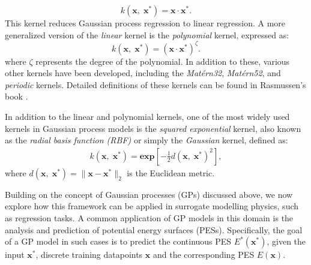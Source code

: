 \begin{equation} \label{equ:2.30}
k(\mathbf{x},\;\mathbf{x}^{\ast}) = \mathbf{x} \cdot \mathbf{x}^{\ast}. 
\end{equation}
This kernel reduces Gaussian process regression to linear regression. A more generalized version of the \textit{linear} kernel is the \textit{polynomial} kernel, expressed as:
\begin{equation} \label{equ:2.31}
    k(\mathbf{x},\;\mathbf{x}^{\ast}) = (\mathbf{x} \cdot \mathbf{x}^{\ast})^{\zeta}.
\end{equation}
where $\zeta$ represents the degree of the polynomial.
In addition to these, various other kernels have been developed, including the \textit{Mat\'{e}rn32}, \textit{Mat\'{e}rn52}, and \textit{periodic} kernels.
Detailed definitions of these kernels can be found in Rasmussen's book \cite{RasmussenW06}.

In addition to the linear and polynomial kernels, one of the most widely used kernels in Gaussian process models is the \textit{squared exponential} kernel, also known as the \textit{radial basis function (RBF)} or simply the \textit{Gaussian} kernel, defined as:
\begin{equation} \label{equ:2.32}
        \begin{split}
            k(\mathbf{x},\;\mathbf{x}^{*})= \mathbf{exp}\left[-\frac{1}{2}d(\mathbf{x},\;\mathbf{x}^{*})^{2}\right],
        \end{split}
\end{equation}
where $d(\mathbf{x},\;\mathbf{x}^{*})=\lVert\mathbf{x}-\mathbf{x}^{*}\rVert_{2}$ is the Euclidean metric.

Building on the concept of Gaussian processes (GPs) discussed above, we now explore how this framework can be applied in surrogate modelling physics, such as regression tasks.
A common application of GP models in this domain is the analysis and prediction of potential energy surfaces (PESs). 
Specifically, the goal of a GP model in such cases is to predict the continuous PES $E^{*}(\mathbf{x}^{*})$, given the input $\mathbf{x}^{*}$, discrete training datapoints $\mathbf{x}$ and the corresponding PES $E(\mathbf{x})$.

